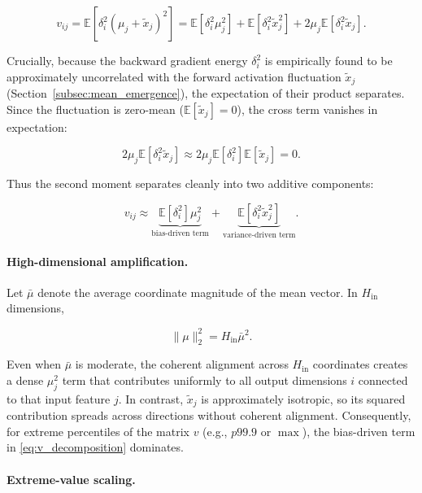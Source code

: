 \begin{equation}
v_{ij}
=
\mathbb{E}[\delta_i^2 (\mu_j + \tilde{x}_j)^2]
=
\mathbb{E}[\delta_i^2 \mu_j^2]
+
\mathbb{E}[\delta_i^2 \tilde{x}_j^2]
+
2\mu_j \mathbb{E}[\delta_i^2 \tilde{x}_j].
\end{equation}

Crucially, because the backward gradient energy $\delta_i^2$ is empirically found to be approximately uncorrelated
with the forward activation fluctuation $\tilde{x}_j$
(Section~\ref{subsec:mean_emergence}),
the expectation of their product separates. Since the fluctuation is zero-mean ($\mathbb{E}[\tilde{x}_j] = 0$), the cross term vanishes in expectation:

\begin{equation}
2\mu_j \mathbb{E}[\delta_i^2 \tilde{x}_j]
\approx
2\mu_j \mathbb{E}[\delta_i^2]\mathbb{E}[\tilde{x}_j]
= 0.
\end{equation}

Thus the second moment separates cleanly into two additive components:

\begin{equation}
v_{ij}
\approx
\underbrace{\mathbb{E}[\delta_i^2]\mu_j^2}_{\text{bias-driven term}}
+
\underbrace{\mathbb{E}[\delta_i^2 \tilde{x}_j^2]}_{\text{variance-driven term}}.
\label{eq:v_decomposition}
\end{equation}

\paragraph{High-dimensional amplification.}

Let $\bar{\mu}$ denote the average coordinate magnitude of the mean vector.
In $H_{\text{in}}$ dimensions,

\begin{equation}
\|\mu\|_2^2 = H_{\text{in}} \bar{\mu}^2.
\end{equation}

Even when $\bar{\mu}$ is moderate,
the coherent alignment across $H_{\text{in}}$ coordinates
creates a dense $\mu_j^2$ term that contributes uniformly
to all output dimensions $i$ connected to that input feature $j$.
In contrast, $\tilde{x}_j$ is approximately isotropic,
so its squared contribution spreads across directions
without coherent alignment.
Consequently, for extreme percentiles of the matrix $v$
(e.g., $p99.9$ or $\max$),
the bias-driven term in \eqref{eq:v_decomposition}
dominates.

\paragraph{Extreme-value scaling.}

